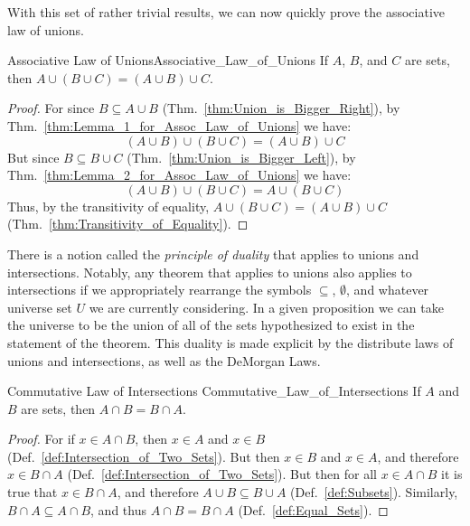         With this set of rather trivial results, we can now quickly prove the
        associative law of unions.
        \begin{ltheorem}{Associative Law of Unions}{Associative_Law_of_Unions}
            If $A$, $B$, and $C$ are sets, then
            $A\cup(B\cup{C})=(A\cup{B})\cup{C}$.
        \end{ltheorem}
        \begin{proof}
            For since $B\subseteq{A}\cup{B}$
            (Thm.~\ref{thm:Union_is_Bigger_Right}), by
            Thm.~\ref{thm:Lemma_1_for_Assoc_Law_of_Unions} we have:
            \begin{equation}
                (A\cup{B})\cup(B\cup{C})=(A\cup{B})\cup{C}
            \end{equation}
            But since $B\subseteq{B}\cup{C}$
            (Thm.~\ref{thm:Union_is_Bigger_Left}),
            by Thm.~\ref{thm:Lemma_2_for_Assoc_Law_of_Unions} we have:
            \begin{equation}
                (A\cup{B})\cup(B\cup{C})=A\cup(B\cup{C})
            \end{equation}
            Thus, by the transitivity of equality,
            $A\cup(B\cup{C})=(A\cup{B})\cup{C}$
            (Thm.~\ref{thm:Transitivity_of_Equality}).
        \end{proof}
        There is a notion called the \textit{principle of duality}%
         that applies to unions and intersections.
        Notably, any theorem that applies to unions also applies to
        intersections if we appropriately rearrange the symbols $\subseteq$,
        $\emptyset$, and whatever universe set $U$ we are currently considering.
        In a given proposition we can take the universe to be the union of all
        of the sets hypothesized to exist in the statement of the theorem. This
        duality is made explicit by the distribute laws of unions and
        intersections, as well as the DeMorgan Laws.
        \begin{ltheorem}{Commutative Law of Intersections}
                        {Commutative_Law_of_Intersections}
            If $A$ and $B$ are sets, then $A\cap{B}=B\cap{A}$.
        \end{ltheorem}
        \begin{proof}
            For if $x\in{A}\cap{B}$, then $x\in{A}$ and $x\in{B}$
            (Def.~\ref{def:Intersection_of_Two_Sets}). But then $x\in{B}$ and
            $x\in{A}$, and therefore $x\in{B}\cap{A}$
            (Def.~\ref{def:Intersection_of_Two_Sets}). But then for all
            $x\in{A}\cap{B}$ it is true that $x\in{B}\cap{A}$, and therefore
            $A\cup{B}\subseteq{B}\cup{A}$ (Def.~\ref{def:Subsets}). Similarly,
            $B\cap{A}\subseteq{A}\cap{B}$, and thus $A\cap{B}=B\cap{A}$
            (Def.~\ref{def:Equal_Sets}).
        \end{proof}
